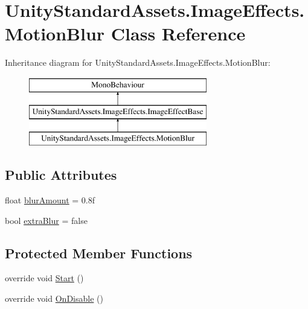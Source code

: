 \hypertarget{class_unity_standard_assets_1_1_image_effects_1_1_motion_blur}{}\section{Unity\+Standard\+Assets.\+Image\+Effects.\+Motion\+Blur Class Reference}
\label{class_unity_standard_assets_1_1_image_effects_1_1_motion_blur}
Inheritance diagram for Unity\+Standard\+Assets.\+Image\+Effects.\+Motion\+Blur\+:\begin{figure}[H]
\begin{center}
\leavevmode
\includegraphics[height=3.000000cm]{class_unity_standard_assets_1_1_image_effects_1_1_motion_blur}
\end{center}
\end{figure}
\subsection*{Public Attributes}
\begin{DoxyCompactItemize}
\item 
float \mbox{\hyperlink{class_unity_standard_assets_1_1_image_effects_1_1_motion_blur_a54733adc5aa5771813151c4e8997fa87}{blur\+Amount}} = 0.\+8f
\item 
bool \mbox{\hyperlink{class_unity_standard_assets_1_1_image_effects_1_1_motion_blur_aa0a8ae7dbf75b8ca6157a37fd87d299d}{extra\+Blur}} = false
\end{DoxyCompactItemize}
\subsection*{Protected Member Functions}
\begin{DoxyCompactItemize}
\item 
override void \mbox{\hyperlink{class_unity_standard_assets_1_1_image_effects_1_1_motion_blur_a70794816583f9b26550755153bdb85c3}{Start}} ()
\item 
override void \mbox{\hyperlink{class_unity_standard_assets_1_1_image_effects_1_1_motion_blur_a2ad7688bd3a705deb52d448fdf6a0c31}{On\+Disable}} ()
\end{DoxyCompactItemize}
